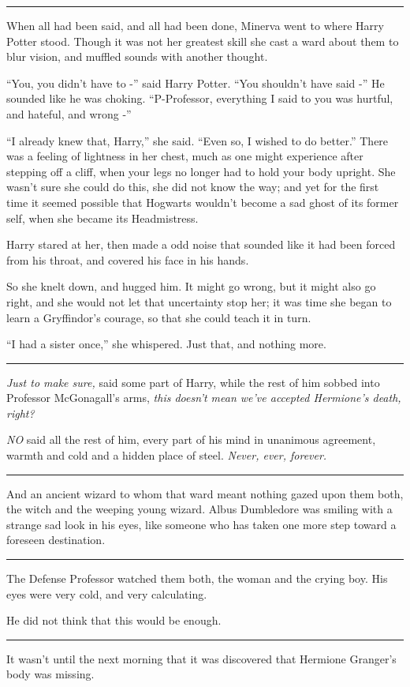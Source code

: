 \begin{center}\rule{3in}{0.4pt}\end{center}

When all had been said, and all had been done, Minerva went to where
Harry Potter stood. Though it was not her greatest skill she cast a ward
about them to blur vision, and muffled sounds with another thought.

``You, you didn't have to -'' said Harry Potter. ``You shouldn't have
said -'' He sounded like he was choking. ``P-Professor, everything I
said to you was hurtful, and hateful, and wrong -''

``I already knew that, Harry,'' she said. ``Even so, I wished to do
better.'' There was a feeling of lightness in her chest, much as one
might experience after stepping off a cliff, when your legs no longer
had to hold your body upright. She wasn't sure she could do this, she
did not know the way; and yet for the first time it seemed possible that
Hogwarts wouldn't become a sad ghost of its former self, when she became
its Headmistress.

Harry stared at her, then made a odd noise that sounded like it had been
forced from his throat, and covered his face in his hands.

So she knelt down, and hugged him. It might go wrong, but it might also
go right, and she would not let that uncertainty stop her; it was time
she began to learn a Gryffindor's courage, so that she could teach it in
turn.

``I had a sister once,'' she whispered. Just that, and nothing more.

\begin{center}\rule{3in}{0.4pt}\end{center}

\emph{Just to make sure,} said some part of Harry, while the rest of him
sobbed into Professor McGonagall's arms, \emph{this doesn't mean we've
accepted Hermione's death, right?}

\emph{NO} said all the rest of him, every part of his mind in unanimous
agreement, warmth and cold and a hidden place of steel. \emph{Never,
ever, forever.}

\begin{center}\rule{3in}{0.4pt}\end{center}

And an ancient wizard to whom that ward meant nothing gazed upon them
both, the witch and the weeping young wizard. Albus Dumbledore was
smiling with a strange sad look in his eyes, like someone who has taken
one more step toward a foreseen destination.

\begin{center}\rule{3in}{0.4pt}\end{center}

The Defense Professor watched them both, the woman and the crying boy.
His eyes were very cold, and very calculating.

He did not think that this would be enough.

\begin{center}\rule{3in}{0.4pt}\end{center}

It wasn't until the next morning that it was discovered that Hermione
Granger's body was missing.
